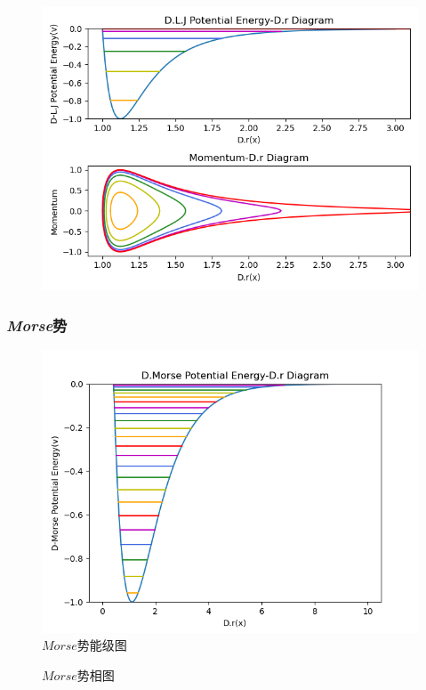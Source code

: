 \documentclass[11pt, a4paper, oneside]{ctexart}
\begin{document}
{{{\begin{appendices}
{\begin{figure}[!ht]
            \centering
            \includegraphics[scale=0.75]{dh3.png}
        \end{figure} 
    }
    \newpage\subsubsection{\emph{Morse}势}
    {
        \begin{figure}[!ht]
            \caption{ $Morse$势能级图}
            \centering
            \includegraphics[scale=0.75]{dh-1.png}
        \end{figure} 
        \begin{figure}[!ht]
            \caption{ $Morse$势相图}
	

\end{figure}}
\end{appendices}}}}
\end{document}
